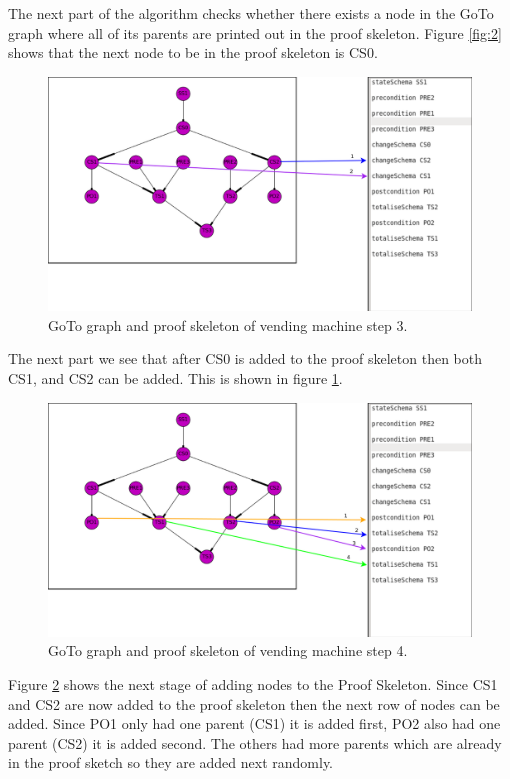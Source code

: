 The next part of the algorithm checks whether there exists a node in the GoTo graph where all of its parents are printed out in the proof skeleton. Figure \ref{fig:2} shows that the next node to be in the proof skeleton is CS0. 

\begin{figure}[H]
\includegraphics[scale=0.3]{Figures/skeleton/3.png}
\caption{GoTo graph and proof skeleton of vending machine step 3.}
\label{fig:3}
\end{figure}

The next part we see that after CS0 is added to the proof skeleton then both CS1, and CS2 can be added. This is shown in figure \ref{fig:3}.

\begin{figure}[H]
\includegraphics[scale=0.3]{Figures/skeleton/4.png}
\caption{GoTo graph and proof skeleton of vending machine step 4.}
\label{fig:4}
\end{figure}

Figure \ref{fig:4} shows the next stage of adding nodes to the Proof Skeleton. Since CS1 and CS2 are now added to the proof skeleton then the next row of nodes can be added. Since PO1 only had one parent (CS1) it is added first, PO2 also had one parent (CS2) it is added second. The others had more parents which are already in the proof sketch so they are added next randomly.

